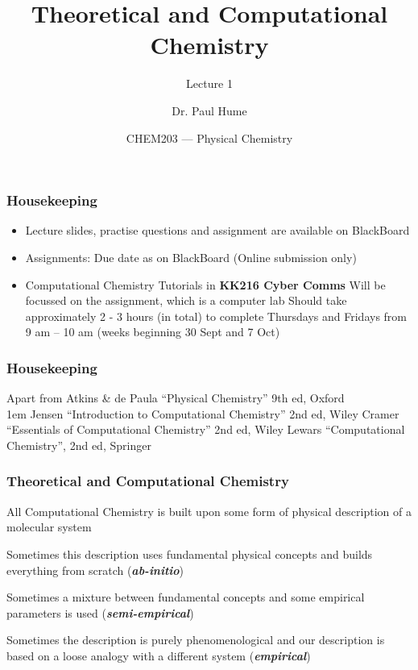 \documentclass{beamer}
\title{Theoretical and Computational Chemistry}
\subtitle{Lecture 1}
\date[Math 161]{CHEM203 --- Physical Chemistry}
\author[Dr Hume]{Dr. Paul Hume}
\institute[institute]{\hfill\href{mailto:paul.hume@vuw.ac.nz}{\texttt{paul.hume@vuw.ac.nz}}\\
\hfill\phone{} 04 463 6760 (internal ext. 6760)\\
\hfill Alan MacDiarmid Bldg. 2nd Floor, Office 203}
\begin{document}
\begin{frame}
\titlepage
\end{frame}


\begin{frame}
 \frametitle{Housekeeping}

\begin{itemize}
 \item Lecture slides, practise questions and assignment are available on BlackBoard
\item Assignments: Due date as on BlackBoard (Online submission only)
\item Computational Chemistry Tutorials in \textbf{KK216 Cyber Comms}
Will be focussed on the assignment, which is a computer lab
Should take approximately 2 - 3 hours (in total) to complete
Thursdays and Fridays from 9 am – 10 am
(weeks beginning 30 Sept and 7 Oct)
\end{itemize}

\end{frame}



\begin{frame}
\frametitle{Housekeeping}

Apart from Atkins \& de Paula “Physical Chemistry” 9th ed, Oxford\\\parskip1em
Jensen “Introduction to Computational Chemistry” 2nd ed, Wiley
Cramer “Essentials of Computational Chemistry” 2nd ed, Wiley
Lewars “Computational Chemistry”, 2nd ed, Springer


\end{frame}


\begin{frame}
\frametitle{Theoretical and Computational Chemistry}

All Computational Chemistry is built upon some form of physical description of a
molecular system

\begin{definition}
	Sometimes this description uses fundamental physical concepts and builds everything from scratch (\textbf{\textit{ab-initio}})
\end{definition}

\begin{definition}
Sometimes a mixture between fundamental concepts and some empirical parameters is used (\textbf{\textit{semi-empirical}})
\end{definition}

\begin{definition}
	Sometimes the description is purely phenomenological and our description is based on a loose analogy with a different system (\textbf{\textit{empirical}})
\end{definition}	
	
	
\end{frame}
\end{document}
